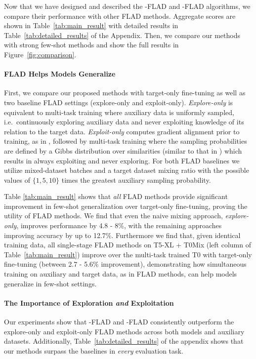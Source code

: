 Now that we have designed and described the \ex{}-FLAD and \ucb{}-FLAD algorithms, we compare their performance with other FLAD methods. Aggregate scores are shown in Table~\ref{tab:main_result} with detailed results in Table~\ref{tab:detailed_results} of the Appendix. Then, we compare our methods with strong few-shot methods and show the full results in Figure~\ref{fig:comparison}.


\paragraph{FLAD Helps Models Generalize}
First, we compare our proposed methods with target-only fine-tuning as well as two baseline FLAD settings (explore-only and exploit-only). \textit{Explore-only} is equivalent to multi-task training where auxiliary data is uniformly sampled, i.e.\ continuously exploring auxiliary data and never exploiting knowledge of its relation to the target data. \textit{Exploit-only} computes gradient alignment prior to training, as in \ucb{}, followed by multi-task training where the sampling probabilities are defined by a Gibbs distribution over similarities (similar to that in \ex{}) which results in always exploiting and never exploring. For both FLAD baselines we utilize mixed-dataset batches and a target dataset mixing ratio with the possible values of $\{1,5,10\}$ times the greatest auxiliary sampling probability.

Table \ref{tab:main_result} shows that \textit{all} FLAD methods provide significant improvement in few-shot generalization over target-only fine-tuning, proving the utility of FLAD methods. We find that even the naive mixing approach, \textit{explore-only}, improves performance by 4.8 - 8\%, with the remaining approaches improving accuracy by up to 12.7\%.
Furthermore we find that, given identical training data, all single-stage FLAD methods on T5-XL + T0Mix (left column of Table~\ref{tab:main_result}) improve over the multi-task trained T0 with target-only fine-tuning (between 2.7 - 5.6\% improvement), demonstrating how simultaneous training on auxiliary and target data, as in FLAD methods, can help models generalize in few-shot settings.

\paragraph{The Importance of Exploration \textit{and} Exploitation}
Our experiments show that \ex{}-FLAD and \ucb{}-FLAD consistently outperform the explore-only and exploit-only FLAD methods across both models and auxiliary datasets. Additionally, Table~\ref{tab:detailed_results} of the appendix shows that our methods surpass the baselines in \textit{every} evaluation task.

